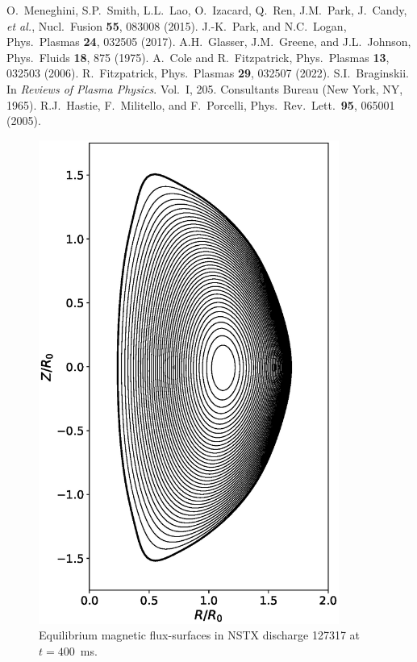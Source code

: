\documentclass[12pt,prb,aps]{revtex4-1}
\begin{document}
\begin{thebibliography}{99}
 O.~Meneghini, S.P.~Smith, L.L.~Lao, O.~Izacard, Q.~Ren, J.M.~Park, J.~Candy, {\em et al.}, Nucl.\ Fusion {\bf 55}, 083008 (2015). 
 J.-K.~Park, and N.C.~Logan, Phys.\ Plasmas {\bf 24}, 032505 (2017).
 A.H.~Glasser, J.M.~Greene, and J.L.~Johnson, Phys.\ Fluids {\bf 18}, 875 (1975).
 A.~Cole and R.~Fitzpatrick, Phys.\ Plasmas {\bf 13}, 032503 (2006).
 R.~Fitzpatrick, Phys.\ Plasmas {\bf 29}, 032507 (2022). 
 S.I.~Braginskii. In {\em Reviews of Plasma Physics}. Vol.~I, 205. Consultants Bureau (New York, NY, 1965).
 R.J.~Hastie, F.~Militello, and F.~Porcelli, Phys.\ Rev.\ Lett.\ {\bf 95}, 065001 (2005).


\end{thebibliography}
\newpage

\begin{figure}
\centerline{\includegraphics[height=6.25in]{Fig0.eps}}
\caption{Equilibrium magnetic flux-surfaces in NSTX discharge 127317 at $t=400$\, ms.}\label{fig0}
\end{figure}
\end{document}
